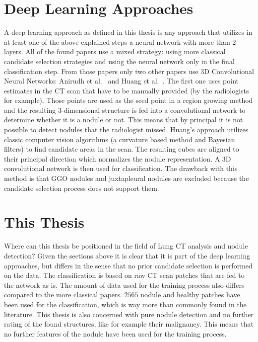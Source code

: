 \documentclass[main.tex]{subfiles}
\begin{document}
\section{Deep Learning Approaches}
A deep learning approach as defined in this thesis is any approach that utilizes in at least one of the above-explained steps a neural network with more than $2$ layers. All of the found papers use a mixed strategy: using more classical candidate selection strategies and using the neural network only in the final classification step. From those papers only two other papers use 3D Convolutional Neural Networks: Anirudh et al.~\cite{anirudh2016lung} and Huang et al.~\cite{huang2017lung}. The first one uses point estimates in the CT scan that have to be manually provided (by the radiologists for example). Those points are used as the seed point in a region growing method and the resulting 3-dimensional structure is fed into a convolutional network to determine whether it is a nodule or not. This means that by principal it is not possible to detect nodules that the radiologist missed. Huang's approach utilizes classic computer vision algorithms (a curvature based method and Bayesian filters) to find candidate areas in the scan. The resulting cubes are aligned to their principal direction which normalizes the nodule representation. A 3D convolutional network is then used for classification. The drawback with this method is that GGO nodules and juxtapleural nodules are excluded because the candidate selection process does not support them.


\section{This Thesis}
Where can this thesis be positioned in the field of Lung CT analysis and nodule detection? Given the sections above it is clear that it is part of the deep learning approaches, but differs in the sense that no prior candidate selection is performed on the data. The classification is based on raw CT scan patches that are fed to the network as is. The amount of data used for the training process also differs compared to the more classical papers. $2565$ nodule and healthy patches have been used for the classification, which is way more than commonly found in the literature. This thesis is also concerned with pure nodule detection and no further rating of the found structures, like for example their malignancy. This means that no further features of the nodule have been used for the training process.
\end{document}
